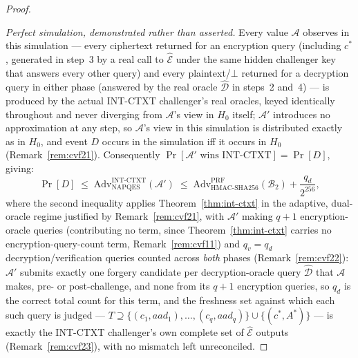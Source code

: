 \documentclass[11pt,a4paper]{article}
\begin{document}
\begin{proof}
\begin{enumerate}
\end{enumerate}
\emph{Perfect simulation, demonstrated rather than asserted.} Every value
$\mathcal{A}$ observes in this simulation --- every ciphertext returned
for an encryption query (including $c^*$, generated in step~3 by a real
call to $\hat{\mathcal{E}}$ under the same hidden challenger key that
answers every other query) and every plaintext/$\bot$ returned for a
decryption query in either phase (answered by the real oracle
$\hat{\mathcal{D}}$ in steps~2 and~4) --- is produced by the actual
INT-CTXT challenger's real oracles, keyed identically throughout and
never diverging from $\mathcal{A}$'s view in $H_0$ itself; $\mathcal{A}'$
introduces no approximation at any step, so $\mathcal{A}$'s view in this
simulation is distributed exactly as in $H_0$, and event $D$ occurs in
the simulation iff it occurs in $H_0$ (Remark~\ref{rem:cvf21}).
Consequently $\Pr[\mathcal{A}'\text{ wins INT-CTXT}] = \Pr[D]$, giving:
\[
  \Pr[D]
  \;\leq\;
  \mathrm{Adv}^{\mathrm{INT\text{-}CTXT}}_{\mathrm{NAPQES}}(\mathcal{A}')
  \;\leq\;
  \mathrm{Adv}^{\mathrm{PRF}}_{\mathrm{HMAC\text{-}SHA256}}(\mathcal{B}_2)
  + \frac{q_d}{2^{256}},
\]
where the second inequality applies Theorem~\ref{thm:int-ctxt} in the
adaptive, dual-oracle regime justified by Remark~\ref{rem:cvf21}, with
$\mathcal{A}'$ making $q+1$ encryption-oracle queries (contributing no
term, since Theorem~\ref{thm:int-ctxt} carries no encryption-query-count
term, Remark~\ref{rem:cvf11}) and $q_v = q_d$ decryption/verification
queries counted across \emph{both} phases (Remark~\ref{rem:cvf22}):
$\mathcal{A}'$ submits exactly one forgery candidate per decryption-oracle
query $\hat{\mathcal{D}}$ that $\mathcal{A}$ makes, pre- or
post-challenge, and none from its $q+1$ encryption queries, so $q_d$ is
the correct total count for this term, and the freshness set against
which each such query is judged --- $T \supseteq
\{(c_1,aad_1),\ldots,(c_q,aad_q)\} \cup \{(c^*,A^*)\}$ --- is exactly the
INT-CTXT challenger's own complete set of $\hat{\mathcal{E}}$ outputs
(Remark~\ref{rem:cvf23}), with no mismatch left unreconciled.


\end{proof}
\end{document}
